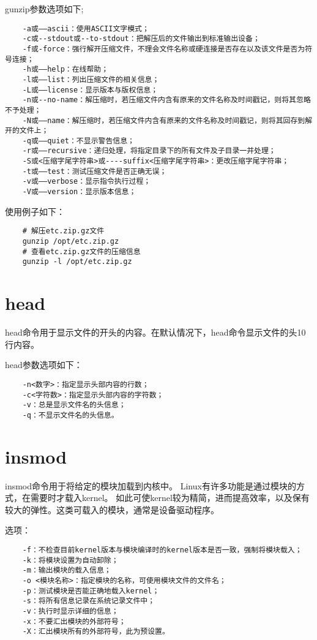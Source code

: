 \documentclass[a4paper,left=2.5cm,right=2.5cm,11pt]{article}
\begin{document}
	gunzip参数选项如下;
	\begin{lstlisting}
	-a或——ascii：使用ASCII文字模式； 
	-c或--stdout或--to-stdout：把解压后的文件输出到标准输出设备； 
	-f或-force：强行解开压缩文件，不理会文件名称或硬连接是否存在以及该文件是否为符号连接； 
	-h或——help：在线帮助； 
	-l或——list：列出压缩文件的相关信息； 
	-L或——license：显示版本与版权信息； 
	-n或--no-name：解压缩时，若压缩文件内含有原来的文件名称及时间戳记，则将其忽略不予处理； 
	-N或——name：解压缩时，若压缩文件内含有原来的文件名称及时间戳记，则将其回存到解开的文件上； 
	-q或——quiet：不显示警告信息； 
	-r或——recursive：递归处理，将指定目录下的所有文件及子目录一并处理； 
	-S或<压缩字尾字符串>或----suffix<压缩字尾字符串>：更改压缩字尾字符串； 
	-t或——test：测试压缩文件是否正确无误； 
	-v或——verbose：显示指令执行过程； 
	-V或——version：显示版本信息；
	\end{lstlisting}

	使用例子如下：
	\begin{lstlisting}
	# 解压etc.zip.gz文件
	gunzip /opt/etc.zip.gz
	# 查看etc.zip.gz文件的压缩信息
	gunzip -l /opt/etc.zip.gz
	\end{lstlisting}

\section{head}
	head命令用于显示文件的开头的内容。在默认情况下，head命令显示文件的头10行内容。\par

	head参数选项如下：
	\begin{lstlisting}
	-n<数字>：指定显示头部内容的行数； 
	-c<字符数>：指定显示头部内容的字符数； 
	-v：总是显示文件名的头信息； 
	-q：不显示文件名的头信息。
	\end{lstlisting}

\section{insmod}
	insmod命令用于将给定的模块加载到内核中。
	Linux有许多功能是通过模块的方式，在需要时才载入kernel。
	如此可使kernel较为精简，进而提高效率，以及保有较大的弹性。这类可载入的模块，通常是设备驱动程序。\par

	选项：
	\begin{lstlisting}
	-f：不检查目前kernel版本与模块编译时的kernel版本是否一致，强制将模块载入； 
	-k：将模块设置为自动卸除； 
	-m：输出模块的载入信息； 
	-o <模块名称>：指定模块的名称，可使用模块文件的文件名； 
	-p：测试模块是否能正确地载入kernel； 
	-s：将所有信息记录在系统记录文件中； 
	-v：执行时显示详细的信息；
	-x：不要汇出模块的外部符号； 
	-X：汇出模块所有的外部符号，此为预设置。
	\end{lstlisting}
\end{document}
